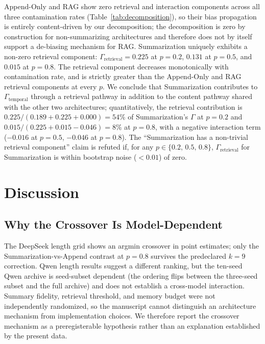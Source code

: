 \documentclass[11pt]{article}
\begin{document}
Append-Only and RAG show zero retrieval and interaction components across all three contamination rates (Table~\ref{tab:decomposition}), so their bias propagation is entirely content-driven by our decomposition; the decomposition is zero by construction for non-summarizing architectures and therefore does not by itself support a de-biasing mechanism for RAG. Summarization uniquely exhibits a non-zero retrieval component: $\Gamma_{\text{retrieval}} = 0.225$ at $p=0.2$, $0.131$ at $p=0.5$, and $0.015$ at $p=0.8$. The retrieval component decreases monotonically with contamination rate, and is strictly greater than the Append-Only and RAG retrieval components at every $p$. We conclude that Summarization contributes to $\Gamma_{\text{temporal}}$ through a retrieval pathway in addition to the content pathway shared with the other two architectures; quantitatively, the retrieval contribution is $0.225/(0.189+0.225+0.000)=54\%$ of Summarization's $\Gamma$ at $p=0.2$ and $0.015/(0.225+0.015-0.046)=8\%$ at $p=0.8$, with a negative interaction term ($-0.016$ at $p{=}0.5$, $-0.046$ at $p{=}0.8$). The ``Summarization has a non-trivial retrieval component'' claim is refuted if, for any $p \in \{0.2,\,0.5,\,0.8\}$, $\Gamma_{\text{retrieval}}$ for Summarization is within bootstrap noise ($< 0.01$) of zero.

\section{Discussion}

\subsection{Why the Crossover Is Model-Dependent}

The DeepSeek length grid shows an argmin crossover in point estimates; only the Summarization-vs-Append contrast at $p{=}0.8$ survives the predeclared $k=9$ correction. Qwen length results suggest a different ranking, but the ten-seed Qwen archive is seed-subset dependent (the ordering flips between the three-seed subset and the full archive) and does not establish a cross-model interaction. Summary fidelity, retrieval threshold, and memory budget were not independently randomized, so the manuscript cannot distinguish an architecture mechanism from implementation choices. We therefore report the crossover mechanism as a preregisterable hypothesis rather than an explanation established by the present data.
\end{document}
